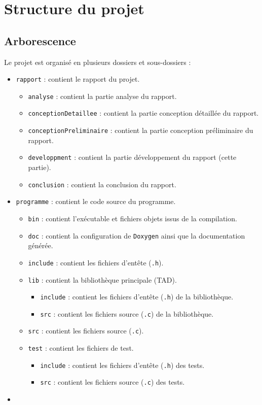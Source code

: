 \section{Structure du projet}

\subsection{Arborescence}

Le projet est organisé en plusieurs dossiers et sous-dossiers :

\begin{itemize}
    \item \texttt{rapport} : contient le rapport du projet.
    \begin{itemize}
        \item \texttt{analyse} : contient la partie analyse du rapport.
        \item \texttt{conceptionDetaillee} : contient la partie conception détaillée du rapport.
        \item \texttt{conceptionPreliminaire} : contient la partie conception préliminaire du rapport.
        \item \texttt{developpment} : contient la partie développement du rapport (cette partie).
        \item \texttt{conclusion} : contient la conclusion du rapport.
    \end{itemize}
    \item \texttt{programme} : contient le code source du programme.
    \begin{itemize}
        \item \texttt{bin} : contient l'exécutable et fichiers objets issus de la compilation.
        \item \texttt{doc} : contient la configuration de \texttt{Doxygen} ainsi que la documentation générée.
        \item \texttt{include} : contient les fichiers d'entête (\texttt{.h}).
        \item \texttt{lib} : contient la bibliothèque principale (TAD).
        \begin{itemize}
            \item \texttt{include} : contient les fichiers d'entête (\texttt{.h}) de la bibliothèque.
            \item \texttt{src} : contient les fichiers source (\texttt{.c}) de la bibliothèque. 
        \end{itemize}
        \item \texttt{src} : contient les fichiers source (\texttt{.c}).
        \item \texttt{test} : contient les fichiers de test.
        \begin{itemize}
            \item \texttt{include} : contient les fichiers d'entête (\texttt{.h}) des tests.
            \item \texttt{src} : contient les fichiers source (\texttt{.c}) des tests.
        \end{itemize}
    \end{itemize}
    \item 
\end{itemize}


